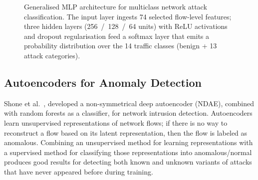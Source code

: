 \begin{figure}[H]
\centering
{}
\caption{Generalised MLP architecture for multiclass network attack classification. The input layer ingests 74 selected flow-level features; three hidden layers (256~/~128~/~64 units) with ReLU activations and dropout regularisation feed a softmax layer that emits a probability distribution over the 14 traffic classes (benign + 13 attack categories).}
\label{fig:mlp_arch}
\end{figure}

\subsection{Autoencoders for Anomaly Detection}

Shone et al.~\cite{shone2018deep}, developed a non-symmetrical deep autoencoder (NDAE), combined with random forests as a classifier, for network intrusion detection. Autoencoders learn unsupervised representations of network flows; if there is no way to reconstruct a flow based on its latent representation, then the flow is labeled as anomalous. Combining an unsupervised method for learning representations with a supervised method for classifying those representations into anomalous/normal produces good results for detecting both known and unknown variants of attacks that have never appeared before during training.

